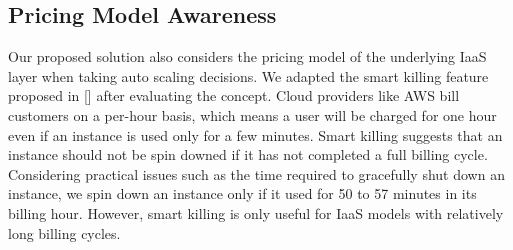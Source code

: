 \subsection {Pricing Model Awareness}
Our proposed solution also considers the pricing model of the underlying IaaS layer when taking auto scaling decisions. We adapted the smart killing feature proposed in [\cite{pluggable}] after evaluating the concept. Cloud providers like AWS bill customers on a per-hour basis, which means a user will be charged for one hour even if an instance is used only for a few minutes. Smart killing suggests that an instance should not be spin downed if it has not completed a full billing cycle. Considering practical issues such as the time required to gracefully shut down an instance, we spin down an instance only if it used for 50 to 57 minutes in its billing hour. However, smart killing is only useful for IaaS models with relatively long billing cycles.